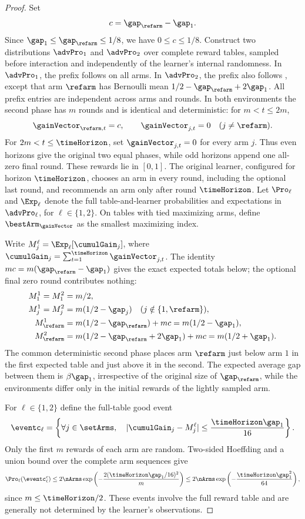 \begin{proof}
Set
\[
c=\gap_{\refarm}-\gap_1.
\]
Since $\gap_1\leq\gap_{\refarm}\leq1/8$, we have $0\leq c\leq1/8$.
Construct two distributions $\advPro_1$ and $\advPro_2$ over complete
reward tables, sampled before interaction and independently of the
learner's internal randomness. In $\advPro_1$, the prefix follows
\basePro{} on all arms. In $\advPro_2$, the prefix also follows
\basePro{}, except that arm $\refarm$ has Bernoulli mean
$1/2-\gap_{\refarm}+2\gap_1$. All prefix entries are independent
across arms and rounds. In both environments the second phase has
$m$ rounds and is identical and deterministic: for $m<t\leq2m$,
\[
\gainVector_{\refarm,t}=c,\qquad
\gainVector_{j,t}=0\quad(j\neq\refarm).
\]
For $2m<t\leq\timeHorizon$, set $\gainVector_{j,t}=0$ for every arm
$j$. Thus even horizons give the original two equal phases, while
odd horizons append one all-zero final round. These rewards lie in
$[0,1]$. The original learner, configured for horizon $\timeHorizon$,
chooses an arm in every round, including the optional last round,
and recommends an arm only after round $\timeHorizon$.
Let $\Pro_\ell$ and $\Exp_\ell$ denote the full table-and-learner
probabilities and expectations in $\advPro_\ell$, for $\ell\in\{1,2\}$.
On tables with tied maximizing arms, define $\bestArm_{\gainVector}$
as the smallest maximizing index.

Write $M_j^\ell=\Exp_\ell[\cumulGain_j]$, where
$\cumulGain_j=\sum_{t=1}^{\timeHorizon}\gainVector_{j,t}$.
The identity $mc=m(\gap_{\refarm}-\gap_1)$ gives the exact expected
totals below; the optional final zero round contributes nothing:
\begin{align*}
M_1^1=M_1^2&=m/2,\\
M_j^1=M_j^2&=m(1/2-\gap_j)
\quad(j\notin\{1,\refarm\}),\\
M_{\refarm}^1
&=m(1/2-\gap_{\refarm})+mc
=m(1/2-\gap_1),\\
M_{\refarm}^2
&=m(1/2-\gap_{\refarm}+2\gap_1)+mc
=m(1/2+\gap_1).
\end{align*}
The common deterministic second phase places arm $\refarm$ just below
arm $1$ in the first expected table and just above it in the second. The expected average
gap between them is $\beta\gap_1$, irrespective of the original
size of $\gap_{\refarm}$, while the environments differ only in the
initial rewards of the lightly sampled arm.

For $\ell\in\{1,2\}$ define the full-table good event
\[
\eventc_\ell=\left\{\forall j\in\setArms,\quad
|\cumulGain_j-M_j^\ell|\leq\frac{\timeHorizon\gap_1}{16}\right\}.
\]
Only the first $m$ rewards of each arm are random. Two-sided Hoeffding
and a union bound over the complete arm sequences give
\begin{equation}\label{eq:goodEventGenAd}
\Pro_\ell(\eventc_\ell^c)
\leq2\nArms\exp\left(-\frac{2(\timeHorizon\gap_1/16)^2}{m}\right)
\leq2\nArms\exp\left(-\frac{\timeHorizon\gap_1^2}{64}\right),
\end{equation}
since $m\leq\timeHorizon/2$. These events involve the full reward
table and are generally not determined by the learner's observations.


\end{proof}
